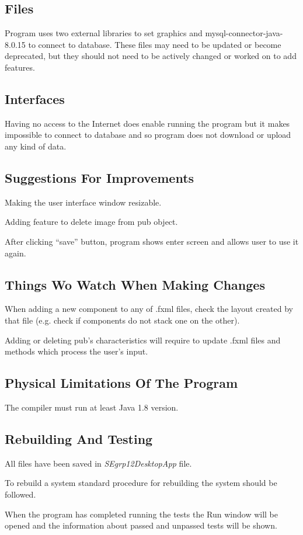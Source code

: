 \documentclass{project}
\begin{document}
\subsection{Files}
Program uses two external libraries to set graphics and mysql-connector-java-8.0.15 to connect to database. These files may need to be updated or become deprecated, but they should not need to be actively changed or worked on to add features. 

\subsection{Interfaces}
Having no access to the Internet does enable running the program but it makes impossible to connect to database and so program does not download or upload any kind of data. 

\subsection{Suggestions For Improvements}
Making the user interface window resizable.\par
Adding feature to delete image from pub object. \par
After clicking “save” button, program shows enter screen and allows user to use it again.\par

\subsection{Things Wo Watch When Making Changes}
When adding a new component to any of .fxml files, check the layout created by that file (e.g. check if components do not stack one on the other).\par
Adding or deleting pub’s characteristics will require to update .fxml files and methods which process the user’s input.\par

\subsection{Physical Limitations Of The Program}
The compiler must run at least Java 1.8 version. 

\subsection{Rebuilding And Testing}
All files have been saved in \textit{SEgrp12DesktopApp} file.\par
To rebuild a system standard procedure for rebuilding the system should be followed.\par
When the program has completed running the tests the Run window will be opened and the information about passed and unpassed tests will be shown. 
\end{document}
